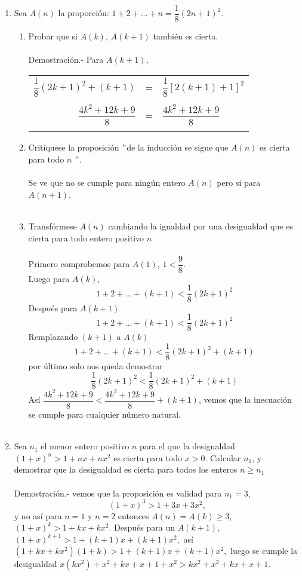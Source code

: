 \begin{enumerate}[\bfseries  1.]
\item Sea $A(n)$ la proporción: $1+2+...+n=\dfrac{1}{8} (2n+1)^2$.
\begin{enumerate}[\bfseries a)]
\item Probar que si $A(k)$, $A(k+1)$ también es cierta.\\\\
Demostración.- \; Para $A(k+1)$, 
\begin{center}
\begin{tabular}{r c l}
$\dfrac{1}{8}(2k+1)^2+(k+1)$&=&$\dfrac{1}{8}\left[2(k+1)+1\right]^2$\\\\
$\dfrac{4k^2+12k+9}{8}$&=&$\dfrac{4k^2+12k+9}{8}$\\\\
\end{tabular}
\end{center}
\item Critíquese la proposición $"$de la inducción se sigue que $A(n)$ es cierta para todo $n$ $"$.\\\\
Se ve que no se cumple para ningún entero $A(n)$ pero si para $A(n+1)$.\\\\ 
\item Transfórmese $A(n)$ cambiando la igualdad por una desigualdad que es cierta para todo entero positivo $n$\\\\
Primero comprobemos para $A(1)$, \; $1<\dfrac{9}{8}$.\\
Luego para $A(k),$ $$1+2+...+(k+1)<\dfrac{1}{8}(2k+1)^2$$
Después para $A(k+1)$ $$1+2+...+(k+1)<\dfrac{1}{8}(2k+1)^2$$
Remplazando $(k+1)$ a $A(k)$ $$1+2+...+(k+1)<\dfrac{1}{8}(2k+1)^2+(k+1)$$
por último solo nos queda demostrar $$\dfrac{1}{8}(2k+1)^2<\dfrac{1}{8}(2k+1)^2+(k+1)$$
Así $\dfrac{4k^2+12k+9}{8}<\dfrac{4k^2+12k+9}{8} +(k+1)$, vemos que la inecuación se cumple para cualquier número natural.\\\\ 
\end{enumerate} 

\item Sea $n_1$ el menor entero positivo $n$ para el que la desigualdad $(1+x)^n>1+nx+nx^2$ es cierta para todo $x>0$. Calcular $n_1$, y demostrar que la desigualdad es cierta para todos los enteros $n\geq n_1$\\\\
Demostración.- \; vemos que la proposición es validad para $n_1=3$, $$(1+x)^3>1+3x+3x^2,$$ y no así para $n=1$ \; y \;$n=2$ entonces $A(n)=A(k)\geq 3$, $(1+x)^k>1+kx+kx^2.$ Después para un $A(k+1)$, $(1+x)^{k+1}>1+(k+1)x+(k+1)x^2,$ así \; $(1+kx+kx^2)(1+k)>1+(k+1)x+(k+1)x^2,$ luego se cumple la desigualdad $x(kx^2)+x^2+kx+x+1+x^2>kx^2+x^2+kx+x+1$.\\\\


\end{enumerate}
